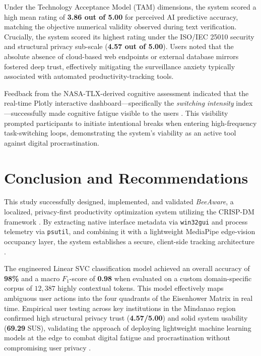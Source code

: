 \documentclass[conference]{IEEEtran}
\begin{document}
Under the Technology Acceptance Model (TAM) dimensions, the system scored a high mean rating of \textbf{3.86 out of 5.00} for perceived AI predictive accuracy, matching the objective numerical validity observed during text verification. Crucially, the system scored its highest rating under the ISO/IEC 25010 security and structural privacy sub-scale (\textbf{4.57 out of 5.00}). Users noted that the absolute absence of cloud-based web endpoints or external database mirrors fostered deep trust, effectively mitigating the surveillance anxiety typically associated with automated productivity-tracking tools.

Feedback from the NASA-TLX-derived cognitive assessment indicated that the real-time Plotly interactive dashboard—specifically the \emph{switching intensity} index—successfully made cognitive fatigue visible to the users \cite{Narechania2021}. This visibility prompted participants to initiate intentional breaks when entering high-frequency task-switching loops, demonstrating the system's viability as an active tool against digital procrastination.

\section{Conclusion and Recommendations}
This study successfully designed, implemented, and validated \emph{BeeAware}, a localized, privacy-first productivity optimization system utilizing the CRISP-DM framework \cite{Abhari2022}. By extracting native interface metadata via \texttt{win32gui} and process telemetry via \texttt{psutil}, and combining it with a lightweight MediaPipe edge-vision occupancy layer, the system establishes a secure, client-side tracking architecture \cite{Lugaresi2019, Bazarevsky2019}. 

The engineered Linear SVC classification model achieved an overall accuracy of \textbf{98\%} and a macro $F_1$-score of \textbf{0.98} when evaluated on a custom domain-specific corpus of $12,387$ highly contextual tokens. This model effectively maps ambiguous user actions into the four quadrants of the Eisenhower Matrix in real time. Empirical user testing across key institutions in the Mindanao region confirmed high structural privacy trust (\textbf{4.57/5.00}) and solid system usability (\textbf{69.29} SUS), validating the approach of deploying lightweight machine learning models at the edge to combat digital fatigue and procrastination without compromising user privacy \cite{Bangor2008, Sauro2016}.
\end{document}
